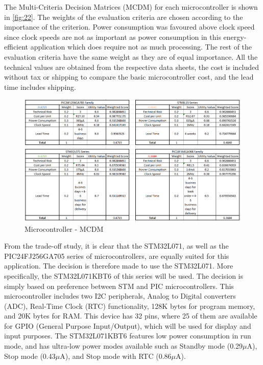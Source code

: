 \noindent
The Multi-Criteria Decision Matrices (MCDM) for each microcontroller is shown in \autoref{fig:22}. The weights of the evaluation criteria are chosen according to the importance of the criterion. Power consumption was favoured above clock speed since clock speeds are not as important as power consumption in this energy-efficient application which does require not as much processing. The rest of the evaluation criteria have the same weight as they are of equal importance. All the technical values are obtained from the respective data sheets, the cost is included without tax or shipping to compare the basic microcontroller cost, and the lead time includes shipping. 
\begin{figure}[H]
	\centering
	\includegraphics[scale=0.55]{img/M-MCDM}
	\caption{Microcontroller - MCDM}
	\label{fig:22}
\end{figure}
\noindent
From the trade-off study, it is clear that the STM32L071, as well as the PIC24FJ256GA705 series of microcontrollers, are equally suited for this application. The decision is therefore made to use the STM32L071. More specifically, the STM32L071KBT6 of this series will be used. The decision is simply based on preference between STM and PIC microcontrollers.  This microcontroller includes two I2C peripherals, Analog to Digital converters (ADC), Real-Time Clock (RTC) functionality, 128K bytes for program memory, and 20K bytes for RAM. This device has 32 pins, where 25 of them are available for GPIO (General Purpose Input/Output), which will be used for display and input purposes. The STM32L071KBT6 features low power consumption in run mode, and has ultra-low power modes available such as Standby mode (0.29$ \mu $A), Stop mode (0.43$ \mu $A), and Stop mode with RTC (0.86$ \mu $A).

